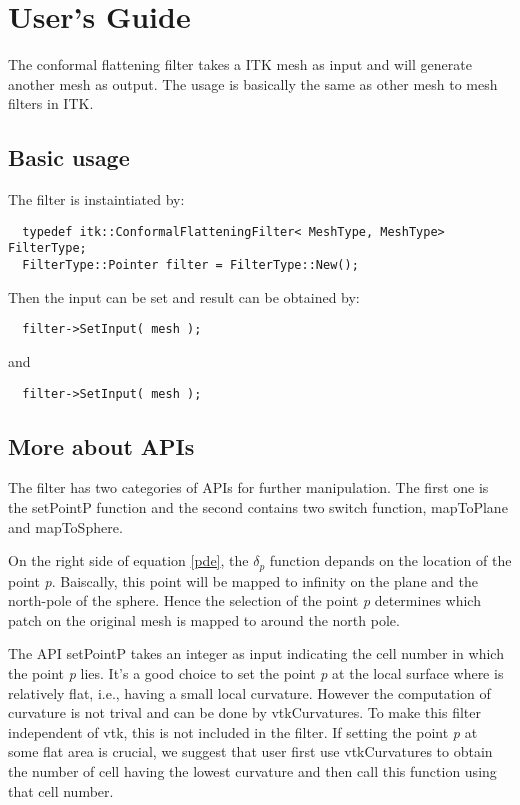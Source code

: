 \documentclass{InsightArticle}
\begin{document}
\section{User's Guide}

The conformal flattening filter takes a ITK mesh as input and will generate another mesh as output.
The usage is basically the same as other mesh to mesh filters in ITK.

\subsection{Basic usage}
The filter is instaintiated by:

\begin{verbatim}
  typedef itk::ConformalFlatteningFilter< MeshType, MeshType>  FilterType;
  FilterType::Pointer filter = FilterType::New();
\end{verbatim}

Then the input can be set and result can be obtained by:

\begin{verbatim}
  filter->SetInput( mesh ); 
\end{verbatim}

and

\begin{verbatim}
  filter->SetInput( mesh ); 
\end{verbatim}

\subsection{More about APIs}
The filter has two categories of APIs for further manipulation.
The first one is the setPointP function and the second contains two switch function, mapToPlane and mapToSphere.

On the right side of equation \ref{pde}, the $\delta_p$ function depands on the location of the point \emph{p}.
Baiscally, this point will be mapped to infinity on the plane and the north-pole of the sphere.
Hence the selection of the point \emph{p} determines which patch on the original mesh is mapped to around the north pole.

The API setPointP takes an integer as input indicating the cell number in which the point \emph{p} lies.
It's a good choice to set the point \emph{p} at the local surface where is relatively flat, i.e., having a small local curvature. 
However the computation of curvature is not trival and can be done by vtkCurvatures. 
To make this filter independent of vtk, this is not included in the filter.
If setting the point \emph{p} at some flat area is crucial, 
we suggest that user first use vtkCurvatures to obtain the number of cell having the lowest curvature and then call this function using that cell number.
\end{document}
